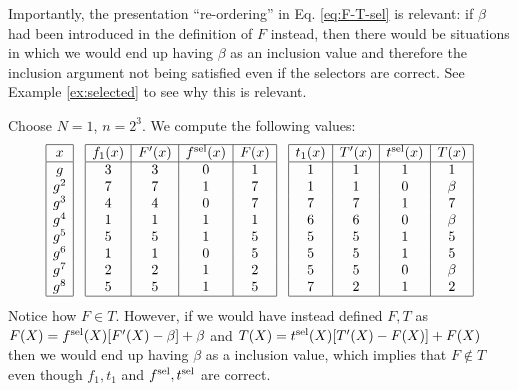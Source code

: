 Importantly, the presentation ``re-ordering'' in Eq. \eqref{eq:F-T-sel} is relevant: if $\beta$ had been introduced in the definition of $F$ instead, then there would be situations in which we would end up having $\beta$ as an inclusion value and therefore the inclusion argument not being satisfied even if the selectors are correct. See Example \ref{ex:selected} to see why this is relevant.
\begin{example}\label{ex:selected}
Choose $N=1$, $n=2^3$. We compute the following values:
\[
\begin{array}{|c|}
\hline
x	\\
\hline
g	\\
g^2	\\
g^3	\\
g^4	\\
g^5	\\
g^6	\\
g^7	\\
g^8	\\
\hline
\end{array}
\hspace{0.3cm}
\begin{array}{|c|c|c|c|}
\hline
f_1(x)	& F'(x) & f^{\text{sel}}(x) & F(x)	\\
\hline
3 & 3 & 0	& 1	\\
7 & 7 & 1	& 7	\\
4 & 4 & 0	& 7	\\
1 & 1 & 1	& 1	\\
5 & 5 & 1	& 5	\\
1 & 1 & 0	& 5	\\
2 & 2 & 1	& 2	\\
5 & 5 & 1	& 5	\\
\hline
\end{array}
\hspace{0.3cm}
\begin{array}{|c|c|c|c|}
\hline
t_1(x)	& T'(x) & t^{\text{sel}}(x) & T(x)	\\
\hline
1	& 1	& 1	& 1	\\
1	& 1	& 0	& \beta	\\
7	& 7	& 1	& 7	\\
6	& 6	& 0	& \beta	\\
5	& 5	& 1	& 5	\\
5	& 5 & 1	& 5	\\
5	& 5	& 0	& \beta	\\
7	& 2	& 1	& 2	\\
\hline
\end{array}
\]
Notice how $F \in T$. However, if we would have instead defined $F,T$ as
$F(X) = f^{\text{sel}}(X) [F'(X) - \beta] + \beta$ and $T(X) = t^{\text{sel}}(X) [T'(X) - F(X)] + F(X)$ then we would end up having $\beta$ as a inclusion value, which implies that $F \notin T$ even though $f_1,t_1$ and $f^{\text{sel}},t^{\text{sel}}$ are correct.
\end{example}

